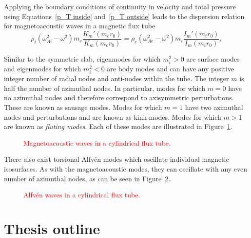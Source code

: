\documentclass[12pt]{../style-files/ociamthesis}
\begin{document}
Applying the boundary conditions of continuity in velocity and total pressure using Equations~\eqref{p_T inside} and~\eqref{p_T outside} leads to the dispersion relation for magnetoacoustic waves in a magnetic flux tube
\begin{equation}
\rho_i(\omega_{Ai}^2 - \omega^2)m_e\frac{K_m'(m_er_0)}{K_m(m_er_0)} = \rho_e(\omega_{Ae}^2 - \omega^2)m_i\frac{I_m'(m_ir_0)}{I_m(m_ir_0)},
\end{equation}

Similar to the symmetric slab, eigenmodes for which $m_i^2 > 0$ are surface modes and eigenmodes for which $m_i^2 < 0$ are body modes and can have any positive integer number of radial nodes and anti-nodes within the tube. The integer $m$ is half the number of azimuthal nodes. In particular, modes for which $m = 0$ have no azimuthal nodes and therefore correspond to axisymmetric perturbations. These are known as sausage modes. Modes for which $m = 1$ have two azimuthal nodes and perturbations and are known as kink modes. Modes for which $m > 1$ are known as \textit{fluting modes}. Each of these modes are illustrated in Figure~\ref{fig: magnetoacoustic waves flux tube}.
\begin{figure}
	\caption{\textcolor{red}{Magnetoacoustic waves in a cylindrical flux tube.}}
	\label{fig: magnetoacoustic waves flux tube}
\end{figure}

There also exist torsional Alfv\'{e}n modes which oscillate individual magnetic isosurfaces. As with the magnetoacoustic modes, they can oscillate with any even number of azimuthal nodes, as can be seen in Figure~\ref{fig: alvfen modes flux tube}.
\begin{figure}
	\caption{\textcolor{red}{Alfv\'{e}n waves in a cylindrical flux tube.}}
	\label{fig: alvfen modes flux tube}
\end{figure}



\section{Thesis outline}
\label{sec:outline}
\end{document}
